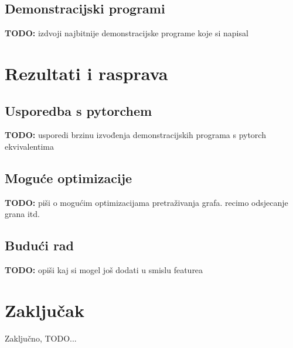 \documentclass[zavrsnirad]{fer}
\begin{document}
\section{Demonstracijski programi}
\textbf{TODO:} izdvoji najbitnije demonstracijske programe koje si napisal
\blindtext

\chapter{Rezultati i rasprava}
\label{pog:rezultati_i_rasprava}

\section{Usporedba s pytorchem}
\textbf{TODO:} usporedi brzinu izvođenja demonstracijskih programa s pytorch ekvivalentima
\blindtext

\section{Moguće optimizacije}
\textbf{TODO:} piši o mogućim optimizacijama pretraživanja grafa. recimo odsjecanje grana itd.
\blindtext

\section{Budući rad}
\textbf{TODO:} opiši kaj si mogel još dodati u smislu featurea
\cite{123DCatch}
\blindtext


\chapter{Zaključak}
\label{pog:zakljucak}

Zaključno, TODO...
\blindtext







\end{document}
